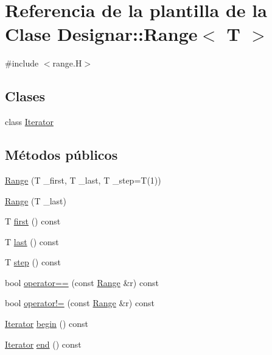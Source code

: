 \hypertarget{class_designar_1_1_range}{}\section{Referencia de la plantilla de la Clase Designar\+:\+:Range$<$ T $>$}
\label{class_designar_1_1_range}


{\ttfamily \#include $<$range.\+H$>$}

\subsection*{Clases}
\begin{DoxyCompactItemize}
\item 
class \hyperlink{class_designar_1_1_range_1_1_iterator}{Iterator}
\end{DoxyCompactItemize}
\subsection*{Métodos públicos}
\begin{DoxyCompactItemize}
\item 
\hyperlink{class_designar_1_1_range_a45c16ed23ea9052133bd8bd1ef3542b1}{Range} (T \+\_\+first, T \+\_\+last, T \+\_\+step=T(1))
\item 
\hyperlink{class_designar_1_1_range_a2a6163d6685fc38f387c36a33ce91578}{Range} (T \+\_\+last)
\item 
T \hyperlink{class_designar_1_1_range_a2f272a5b8100003b052a77bd48f342cd}{first} () const
\item 
T \hyperlink{class_designar_1_1_range_abe2839675b48ab64073c2e74976523c7}{last} () const
\item 
T \hyperlink{class_designar_1_1_range_a831f82b8651e4b4a437aa786288b5aef}{step} () const
\item 
bool \hyperlink{class_designar_1_1_range_ac15a931a2a2de890571f85cff64f6891}{operator==} (const \hyperlink{class_designar_1_1_range}{Range} \&r) const
\item 
bool \hyperlink{class_designar_1_1_range_a736b540580449acc24fd57d4fa51897e}{operator!=} (const \hyperlink{class_designar_1_1_range}{Range} \&r) const
\item 
\hyperlink{class_designar_1_1_range_1_1_iterator}{Iterator} \hyperlink{class_designar_1_1_range_af26fe1974236b1a3ff61992986349b5f}{begin} () const
\item 
\hyperlink{class_designar_1_1_range_1_1_iterator}{Iterator} \hyperlink{class_designar_1_1_range_ab764bbefe3e28a17886e1093371d0e50}{end} () const
\end{DoxyCompactItemize}


